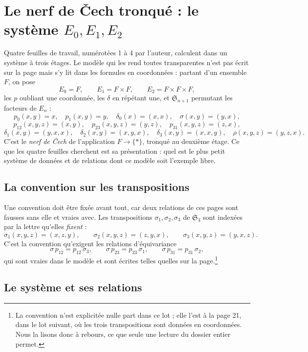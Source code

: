 \documentclass[11pt,a4paper]{article}
\begin{document}
\section*{Le nerf de Čech tronqué : le système $E_{0}, E_{1}, E_{2}$}

Quatre feuilles de travail, numérotées 1 à 4 par l'auteur, calculent dans un
système à trois étages. Le modèle qui les rend toutes transparentes n'est pas
écrit sur la page mais s'y lit dans les formules en coordonnées : partant d'un
ensemble $F$, on pose
\[
  E_{0} = F, \qquad E_{1} = F \times F, \qquad E_{2} = F \times F \times F,
\]
les $p$ oubliant une coordonnée, les $\delta$ en répétant une, et
$\mathfrak{S}_{n+1}$ permutant les facteurs de $E_{n}$ :
\[
  p_{0}(x,y) = x, \quad p_{1}(x,y) = y, \quad \delta_{0}(x) = (x,x),
  \quad \sigma(x,y) = (y,x),
\]
\[
  p_{12}(x,y,z) = (x,y), \quad p_{23}(x,y,z) = (y,z), \quad
  p_{31}(x,y,z) = (z,x),
\]
\[
  \delta_{1}(x,y) = (y,x,x), \quad \delta_{2}(x,y) = (x,y,x), \quad
  \delta_{3}(x,y) = (x,x,y), \quad \rho(x,y,z) = (y,z,x).
\]
C'est le \emph{nerf de Čech} de l'application $F \to \{*\}$, tronqué au
deuxième étage. Ce que les quatre feuilles cherchent est sa présentation : quel
est le plus petit système de données et de relations dont ce modèle soit
l'exemple libre.

\subsection*{La convention sur les transpositions}

Une convention doit être fixée avant tout, car deux relations de ces pages sont
fausses sans elle et vraies avec. Les transpositions $\sigma_{1}, \sigma_{2},
\sigma_{3}$ de $\mathfrak{S}_{3}$ sont indexées par la lettre qu'elles
\emph{fixent} :
\[
  \sigma_{1}(x,y,z) = (x,z,y), \qquad
  \sigma_{2}(x,y,z) = (z,y,x), \qquad
  \sigma_{3}(x,y,z) = (y,x,z).
\]
C'est la convention qu'exigent les relations d'équivariance
\[
  \sigma\, p_{12} = p_{12}\,\sigma_{3}, \qquad
  \sigma\, p_{23} = p_{23}\,\sigma_{1}, \qquad
  \sigma\, p_{31} = p_{31}\,\sigma_{2},
\]
qui sont vraies dans le modèle et sont écrites telles quelles sur la
page.\footnote{La convention n'est explicitée nulle part dans ce lot ; elle
l'est à la page 21, dans le lot suivant, où les trois transpositions sont
données en coordonnées. Nous la lisons donc à rebours, ce que seule une lecture
du dossier entier permet.}

\subsection*{Le système et ses relations}
\end{document}
